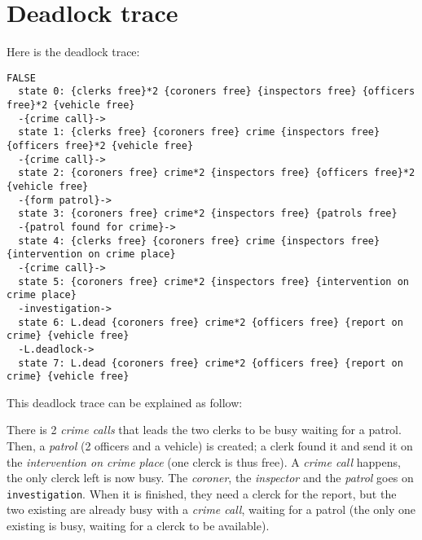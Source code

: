 \section{Deadlock trace}
\label{sec:Deadlock trace}

\lstset{
    frame=single,
    breaklines=true
}

Here is the deadlock trace: \newline

\begin{lstlisting}
FALSE
  state 0: {clerks free}*2 {coroners free} {inspectors free} {officers free}*2 {vehicle free}
  -{crime call}->
  state 1: {clerks free} {coroners free} crime {inspectors free} {officers free}*2 {vehicle free}
  -{crime call}->
  state 2: {coroners free} crime*2 {inspectors free} {officers free}*2 {vehicle free}
  -{form patrol}->
  state 3: {coroners free} crime*2 {inspectors free} {patrols free}
  -{patrol found for crime}->
  state 4: {clerks free} {coroners free} crime {inspectors free} {intervention on crime place}
  -{crime call}->
  state 5: {coroners free} crime*2 {inspectors free} {intervention on crime place}
  -investigation->
  state 6: L.dead {coroners free} crime*2 {officers free} {report on crime} {vehicle free}
  -L.deadlock->
  state 7: L.dead {coroners free} crime*2 {officers free} {report on crime} {vehicle free}
\end{lstlisting}

This deadlock trace can be explained as follow: \newline

There is 2 \textit{crime calls} that leads the two clerks to be busy waiting
for a patrol. Then, a \textit{patrol} (2 officers and a vehicle) is created; a
clerk found it and send it on the \textit{intervention on crime place} (one clerck is thus
free). A \textit{crime call} happens, the only clerck left is now busy. The
\textit{coroner}, the \textit{inspector} and the \textit{patrol} goes on
\verb#investigation#. When it is finished, they need a clerck for the report, but the
two existing are already busy with a \textit{crime call}, waiting for a patrol
(the only one existing is busy, waiting for a clerck to be available). \newline
